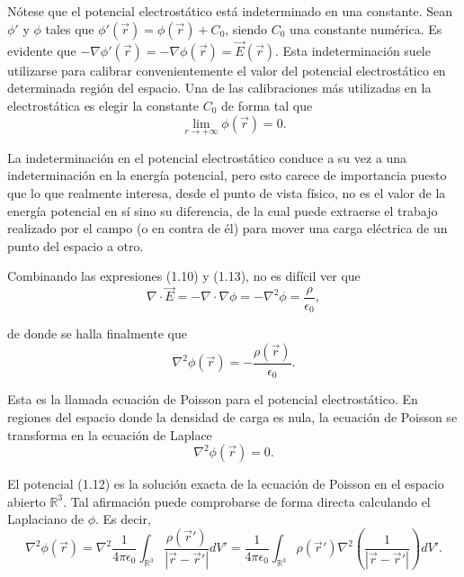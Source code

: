 \documentclass[12pt,a4paper]{book}
\begin{document}
Nótese que el potencial electrostático está indeterminado en una constante. Sean $\phi'$ y $\phi$ tales que $\phi'(\vec{r}) = \phi(\vec{r}) + C_0$, siendo $C_0$ una constante numérica. Es evidente que $-\nabla\phi'(\vec{r}) = -\nabla\phi(\vec{r}) = \vec{E}(\vec{r})$. Esta indeterminación suele utilizarse para calibrar convenientemente el valor del potencial electrostático en determinada región del espacio. Una de las calibraciones más utilizadas en la electrostática es elegir la constante $C_0$ de forma tal que
\begin{equation}
\lim_{r\to+\infty} \phi(\vec{r}) = 0.
\end{equation}

La indeterminación en el potencial electrostático conduce a su vez a una indeterminación en la energía potencial, pero esto carece de importancia puesto que lo que realmente interesa, desde el punto de vista físico, no es el valor de la energía potencial en sí sino su diferencia, de la cual puede extraerse el trabajo realizado por el campo (o en contra de él) para mover una carga eléctrica de un punto del espacio a otro.

Combinando las expresiones (1.10) y (1.13), no es difícil ver que
\begin{equation}
\nabla \cdot \vec{E} = -\nabla \cdot \nabla\phi = -\nabla^2\phi = \frac{\rho}{\epsilon_0},
\end{equation}

de donde se halla finalmente que
\begin{equation}
\nabla^2 \phi(\vec{r}) = -\frac{\rho(\vec{r})}{\epsilon_0}.
\end{equation}

Esta es la llamada ecuación de Poisson para el potencial electrostático. En regiones del espacio donde la densidad de carga es nula, la ecuación de Poisson se transforma en la ecuación de Laplace
\begin{equation}
\nabla^2 \phi(\vec{r}) = 0.
\end{equation}

El potencial (1.12) es la solución exacta de la ecuación de Poisson en el espacio abierto $\mathbb{R}^3$. Tal afirmación puede comprobarse de forma directa calculando el Laplaciano de $\phi$. Es decir,
\begin{equation}
\nabla^2 \phi(\vec{r}) = \nabla^2 \frac{1}{4\pi\epsilon_0} \int_{\mathbb{R}^3} \frac{\rho(\vec{r}')}{|\vec{r} - \vec{r}'|}dV' = \frac{1}{4\pi\epsilon_0} \int_{\mathbb{R}^3} \rho(\vec{r}') \nabla^2 \left( \frac{1}{|\vec{r} - \vec{r}'|} \right) dV'.
\end{equation}
\end{document}

